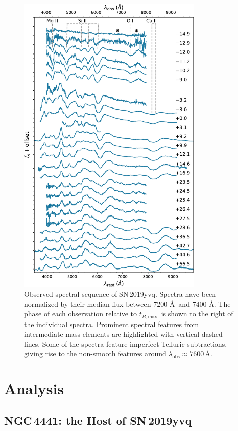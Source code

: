 \documentclass[twocolumn]{aastex63}
\newcommand{\tbmax}{$t_{B,\mathrm{max}}$}
\newcommand{\sn}{SN\,2019yvq}
\begin{document}
\begin{figure}
    \centering
    \includegraphics[width=3.5in]{./figures/spec_evo.pdf}
    \caption{Observed spectral sequence of \sn. Spectra have been normalized
    by their median flux between 7200 \AA\ and 7400 \AA. The phase of each
    observation relative to \tbmax\ is shown to the right of the individual
    spectra. Prominent spectral features from intermediate mass elements are
    highlighted with vertical dashed lines. Some of the spectra feature
    imperfect Telluric subtractions, giving rise to the non-smooth features
    around $\lambda_\mathrm{obs} \approx 7600$\,\AA.}
    \label{fig:spec_evo}
\end{figure}


\section{Analysis}\label{sec:analysis}

\subsection{NGC\,4441: the Host of \sn}
\end{document}
